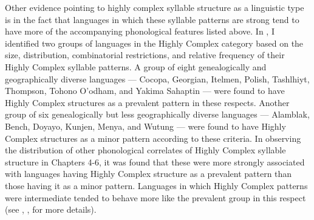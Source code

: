   Other evidence pointing to highly complex syllable structure as a linguistic type is in the fact that languages in which these syllable patterns are strong tend to have more of the accompanying phonological features listed above. In , I identified two groups of languages in the Highly Complex category based on the size, distribution, combinatorial restrictions, and relative frequency of their Highly Complex syllable patterns. A group of eight genealogically and geographically diverse languages — Cocopa, Georgian, Itelmen, Polish, Tashlhiyt, Thompson, Tohono O’odham, and Yakima Sahaptin — were found to have Highly Complex structures as a prevalent pattern in these respects. Another group of six genealogically but less geographically diverse languages — Alamblak, Bench, Doyayo, Kunjen, Menya, and Wutung — were found to have Highly Complex structures as a minor pattern according to these criteria. In observing the distribution of other phonological correlates of Highly Complex syllable structure in Chapters 4-6, it was found that these were more strongly associated with languages having Highly Complex structure as a prevalent pattern than those having it as a minor pattern. Languages in which Highly Complex patterns were intermediate tended to behave more like the prevalent group in this respect (see , ,  for more details).

